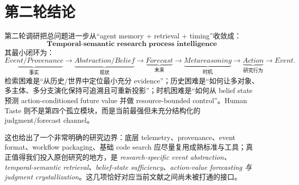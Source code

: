 \documentclass[11pt,a4paper]{ctexart}
\begin{document}
\section{第二轮结论}

第二轮调研把总问题进一步从“agent memory + retrieval + timing”收敛成：
\begin{equation}
\boxed{
\textbf{Temporal-semantic research process intelligence}
}
\end{equation}
其最小闭环为：
\begin{equation}
\boxed{
\underbrace{Event/Provenance}_{事实}
\to
\underbrace{Abstraction/Belief}_{现状}
\to
\underbrace{Forecast}_{未来}
\to
\underbrace{Metareasoning}_{时机}
\to
\underbrace{Action}_{研究行为}
\to Event.
}
\end{equation}
检索困难是“从历史/世界中定位最小充分 evidence”；历史困难是“如何让多对象、多主体、多分支演化保持可追溯且可重新投影”；时机困难是“如何从 belief state 预测 action-conditioned future value 并做 resource-bounded control”。Human Taste 则不是第四个孤立模块，而是当前最强但未充分结构化的 judgment/forecast channel。

这也给出了一个非常明确的研究边界：底层 telemetry、provenance、event format、workflow packaging、基础 code search 应尽量复用成熟标准与工具；真正值得我们投入原创研究的地方，是 \emph{research-specific event abstraction、temporal-semantic retrieval、belief-state sufficiency、action-value forecasting 与 judgment crystallization}。这几项恰好对应当前文献之间尚未被打通的接口。

\printbibliography
\end{document}
